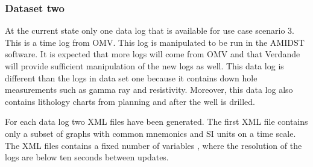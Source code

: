 \documentclass{article}
\theoremstyle{theorem}
\theoremstyle{definition}
\begin{document}
\subsubsection{Dataset two}

At the current state only one data log that is available for use case scenario 3.  This is a time log from OMV.  This log is manipulated to be run in the AMIDST software. It is expected that more logs will come from OMV and that Verdande will provide sufficient manipulation of the new logs as well.  This data log is different than the logs in data set one because it contains down hole measurements such as gamma ray and resistivity.  Moreover, this data log also contains lithology charts from planning and after the well is drilled.

For each data log two XML files have been generated. The first XML file contains only a subset of graphs with common mnemonics and SI units on a time scale. The XML files contains a fixed number of variables , where the resolution of the logs are below ten seconds between updates.
\end{document}
